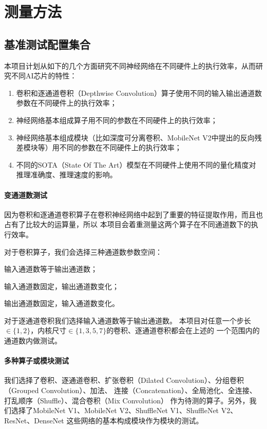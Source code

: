 \section{测量方法}
\subsection{基准测试配置集合}
本项目计划从如下的几个方面研究不同神经网络在不同硬件上的执行效率，从而研究不同AI芯片的特性：
\begin{enumerate}
    \item 卷积和逐通道卷积（Depthwise Convolution）算子使用不同的输入输出通道数参数在不同硬件上的执行效率；
    \item 神经网络基本组成算子用不同的参数在不同硬件上的执行效率；
    \item 神经网络基本组成模块（比如深度可分离卷积、MobileNet V2中提出的反向残差模块等）用不同的参数在不同硬件上的执行效率；
    \item 不同的SOTA（State Of The Art）模型在不同硬件上使用不同的量化精度对推理准确度、推理速度的影响。
\end{enumerate}

\paragraph{变通道数测试}
因为卷积和逐通道卷积算子在卷积神经网络中起到了重要的特征提取作用，而且也占有了比较大的运算量，所以
本项目会着重测量这两个算子在不同通道数下的执行效率。

对于卷积算子，我们会选择三种通道数参数空间：
\begin{enumerate*}
    \item 输入通道数等于输出通道数；
    \item 输入通道数固定，输出通道数变化；
    \item 输出通道数固定，输入通道数变化。
\end{enumerate*}
对于逐通道卷积我们选择输入通道数等于输出通道数。
本项目对任意一个步长$\in \{1,2\}$，内核尺寸$\in \{1,3,5,7\}$的卷积、逐通道卷积都会在上述的
一个范围内的通道数内做测试。

\paragraph{多种算子或模块测试}
我们选择了卷积、逐通道卷积、扩张卷积（Dilated Convolution）、分组卷积（Grouped Convolution）、加法、
连接（Concatenation）、全局池化、全连接、打乱顺序（Shuffle）、混合卷积（Mix Convolution\cite{tan2019mixconv}）
作为待测的算子。另外，我们选择了MobileNet V1、MobileNet V2、ShuffleNet V1、ShuffleNet V2、ResNet、DenseNet
这些网络的基本构成模块作为模块的测试。


